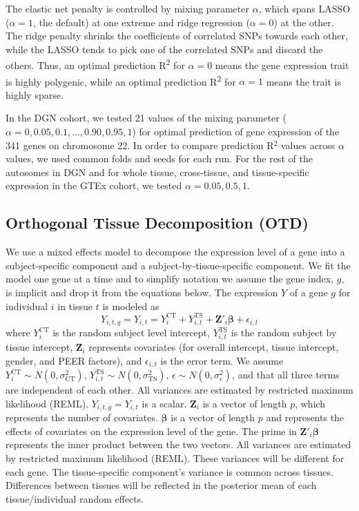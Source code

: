 \documentclass[10pt,letterpaper]{article}
\begin{document}
The elastic net penalty is controlled by mixing parameter \(\alpha\),
which spans LASSO (\(\alpha=1\), the default) \cite{Tibshirani_1996} at one extreme
and ridge regression (\(\alpha=0\)) \cite{Hoerl_1970} at the other. The ridge
penalty shrinks the coefficients of correlated SNPs towards each other,
while the LASSO tends to pick one of the correlated SNPs and discard the
others. Thus, an optimal prediction R\textsuperscript{2} for
\(\alpha=0\) means the gene expression trait is highly polygenic, while
an optimal prediction R\textsuperscript{2} for \(\alpha=1\) means the
trait is highly sparse. 

In the DGN cohort, we tested 21 values of the mixing parameter
(\(\alpha=0, 0.05, 0.1, ..., 0.90, 0.95, 1\)) for optimal prediction of
gene expression of the 341 genes on chromosome 22. In order to compare prediction R$^2$ values across $\alpha$ values, we used common folds and seeds for each run. For the rest of the
autosomes in DGN and for whole tissue, cross-tissue, and tissue-specific
expression in the GTEx cohort, we tested \(\alpha=0.05, 0.5, 1\).


\subsection*{Orthogonal Tissue Decomposition (OTD)}\label{orthogonal-tissue-decomposition}

We use a mixed effects model to decompose the expression level of a gene into a subject-specific component and a subject-by-tissue-specific component.  We fit the model one gene at a time and to simplify notation we assume the gene index, $g$, is implicit and drop it from the equations below. The expression $Y$ of a gene $g$ for individual $i$ in tissue $t$ is modeled as
%
\[Y_{i,t,g} = Y_{i,t} =  Y_{i}^{\text{CT}}   + Y_{i,t}^{\text{TS}} + \mathbf{Z}'_i \boldsymbol{\beta} + \epsilon_{i,t}  \] 
%
%
where $Y_{i}^{\text{CT}}$ is the random subject level intercept,  $Y_{i,t}^{\text{TS}} $ is the random subject by tissue intercept, $\mathbf{Z}_i $ represents covariates (for overall intercept, tissue intercept, gender, and PEER factors), and $\epsilon_{i,t}$ is the error term. We assume $Y_{i}^{\text{CT}} \sim N(0,\sigma_{\text{CT}}^2)$, $Y_{i,t}^{\text{TS}} \sim N(0,\sigma_{\text{TS}}^2)$, $\epsilon \sim N(0,\sigma^2_{\epsilon})$, and that all three terms are independent of each other. All variances are estimated by restricted maximum likelihood (REML). $Y_{i,t,g}=Y_{i,t}$ is a scalar. $\mathbf{Z}_i$ is a vector of length $p$, which represents the number of covariates. $\boldsymbol{\beta}$ is a vector of length $p$ and represents the effects of covariates on the expression level of the gene. The prime in $\mathbf{Z}'_i \boldsymbol{\beta}$ represents the inner product between the two vectors.
All variances are estimated by restricted maximum likelihood (REML). These variances will be different for each gene. The tissue-specific component's variance is common across tissues. Differences between tissues will be reflected in the posterior mean of each tissue/individual random effects.
\end{document}
